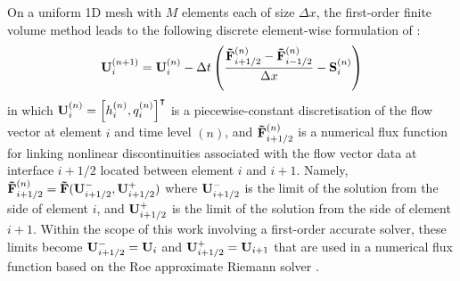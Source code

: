 On a uniform 1D mesh with $M$ elements each of size $\Delta x$, the first-order finite volume method leads to the following discrete element-wise formulation of :
\begin{align}
    \mathbf{U}_i^{(n+1)} = \mathbf{U}_i^{(n)} - \Delta t
    \left(
    \frac{\mathbf{\tilde{F}}_{i+1/2}^{(n)} - \mathbf{\tilde{F}}_{i-1/2}^{(n)}}{\Delta x}
    - \mathbf{S}_i^{(n)} \right) \label{eqn:swe-discrete}
\end{align}
in which $\mathbf{U}_i^{(n)} = \left[ h_i^{(n)}, q_i^{(n)} \right]^\intercal$ is a piecewise-constant discretisation of the flow vector at element $i$ and time level $(n)$, and $\mathbf{\tilde{F}}_{i+1/2}^{(n)}$ is a numerical flux function for linking nonlinear discontinuities associated with the flow vector data at interface $i+1/2$ located between element $i$ and $i + 1$.
Namely, $\mathbf{\tilde{F}}_{i+1/2}^{(n)} = \mathbf{\tilde{F}}(\mathbf{U}_{i+1/2}^-, \mathbf{U}_{i+1/2}^+)$ where $\mathbf{U}_{i+1/2}^-$ is the limit of the solution from the side of element $i$, and $\mathbf{U}_{i+1/2}^+$ is the limit of the solution from the side of element $i+1$.
Within the scope of this work involving a first-order accurate solver, these limits become $\mathbf{U}_{i+1/2}^- = \mathbf{U}_i$ and $\mathbf{U}_{i+1/2}^+ = \mathbf{U}_{i+1}$ that are used in a numerical flux function based on the Roe approximate Riemann solver \citep{roe-pike1984}.

